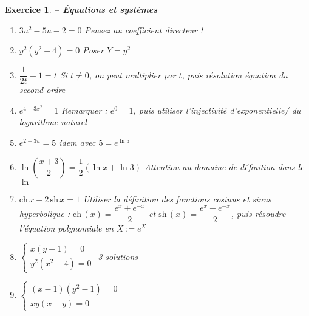 \documentclass[a4paper,11pt]{article}
\newcommand{\ch}{\mathrm{ch}\,}
\newcommand{\sh}{\mathrm{sh}\,}
\newenvironment{alphate}{\begin{enumerate}[label=\alph*)]}{\end{enumerate}}
\newtheorem{exo}{Exercice}
\newenvironment{exercice}{\begin{exo} \em}{\end{exo}}
\begin{document}
\begin{exercice} {\bf -- \'Equations et syst\`emes} 
\begin{alphate}\addtocounter{enumi}{2}
\item $3u^2-5u-2 = 0$ \hspace{1cm} 
    Pensez au coefficient directeur !
\addtocounter{enumi}{1}
\item $y^2(y^2-4)=0$ \hspace{1cm} Poser $Y = y^2$
\item $\dfrac{1}{2t}-1 = t$ \hspace{1cm} 
    Si $t\neq 0$, on peut multiplier par $t$, puis résolution équation du second ordre
\item $e^{4-3x^2} = 1$ \hspace{1cm} 
    Remarquer : $e^0 = 1$, puis utiliser l'injectivité d'exponentielle/ du logarithme naturel
\item $e^{2-3u} = 5$ \hspace{1cm} idem avec $5 = e^{\ln 5}$
\item $\ln\left(\dfrac{x+3}{2}\right)=\dfrac{1}{2}(\ln x+\ln 3)$ \hspace{1cm} 
    Attention au domaine de définition dans le $\ln$
\item $\ch x + 2\, \sh x = 1$ \hspace{1cm} 
    Utiliser la définition des fonctions cosinus et sinus hyperbolique : $\ch(x) = \dfrac{e^x+e^{-x} }{2} $ et $\sh(x) = \dfrac{e^x-e^{-x} }{2}$, puis résoudre l'équation polynomiale en $X:=e^X$ 
\item $\left\{\begin{array}{l} x(y+1)=0 \\ y^2(x^2-4)=0 \end{array}\right.$ \hspace{1cm} 
    3 solutions
\item $\left\{\begin{array}{l} (x-1)(y^2-1)=0 \\ xy(x-y)=0 \end{array}\right.$ \hspace{1cm} 

\end{alphate}
\end{exercice}
\end{document}
